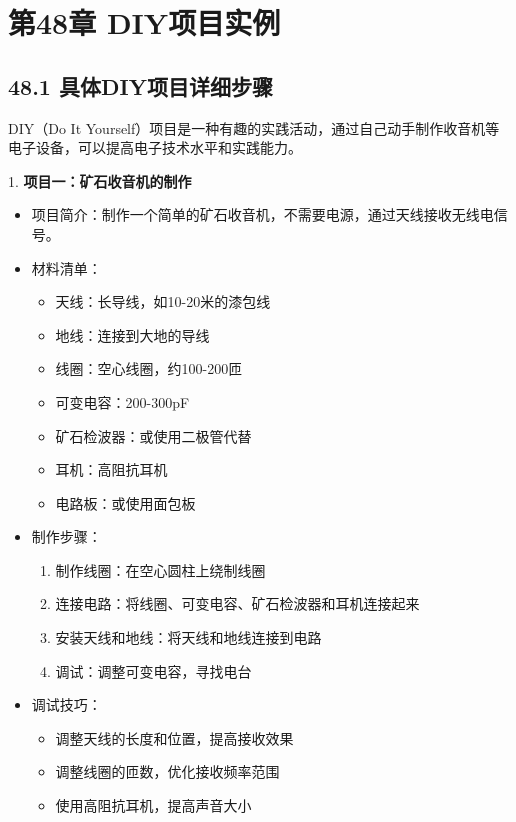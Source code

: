 \documentclass[12pt,UTF8]{ctexbook}
\begin{document}
\chapter*{第48章 DIY项目实例}
\section*{48.1 具体DIY项目详细步骤}

DIY（Do It Yourself）项目是一种有趣的实践活动，通过自己动手制作收音机等电子设备，可以提高电子技术水平和实践能力。

1. \textbf{项目一：矿石收音机的制作}
   \begin{itemize}[leftmargin=3.5em]
   \item 项目简介：制作一个简单的矿石收音机，不需要电源，通过天线接收无线电信号。
   \item 材料清单：
     \begin{itemize}[leftmargin=3.5em]
     \item 天线：长导线，如10-20米的漆包线
     \item 地线：连接到大地的导线
     \item 线圈：空心线圈，约100-200匝
     \item 可变电容：200-300pF
     \item 矿石检波器：或使用二极管代替
     \item 耳机：高阻抗耳机
     \item 电路板：或使用面包板
     \end{itemize}
   \item 制作步骤：
     \begin{enumerate}
     \item 制作线圈：在空心圆柱上绕制线圈
     \item 连接电路：将线圈、可变电容、矿石检波器和耳机连接起来
     \item 安装天线和地线：将天线和地线连接到电路
     \item 调试：调整可变电容，寻找电台
     \end{enumerate}
   \item 调试技巧：
     \begin{itemize}[leftmargin=3.5em]
     \item 调整天线的长度和位置，提高接收效果
     \item 调整线圈的匝数，优化接收频率范围
     \item 使用高阻抗耳机，提高声音大小
     \end{itemize}
   \end{itemize}
\end{document}
